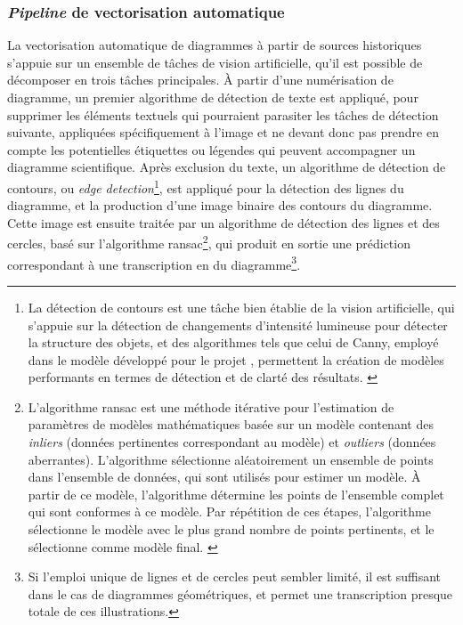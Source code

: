	\subsubsection{\textit{Pipeline} de vectorisation automatique}
	La vectorisation automatique de diagrammes à partir de sources historiques s'appuie sur un ensemble de tâches de vision artificielle, qu'il est possible de décomposer en trois tâches principales. À partir d'une numérisation de diagramme, un premier algorithme de détection de texte est appliqué, pour supprimer les éléments textuels qui pourraient parasiter les tâches de détection suivante, appliquées spécifiquement à l'image et ne devant donc pas prendre en compte les potentielles étiquettes ou légendes qui peuvent accompagner un diagramme scientifique. Après exclusion du texte, un algorithme de détection de contours, ou \textit{edge detection}\footnote{La détection de contours est une tâche bien établie de la vision artificielle, qui s'appuie sur la détection de changements d'intensité lumineuse pour détecter la structure des objets, et des algorithmes tels que celui de Canny, employé dans le modèle développé pour le projet \eida, permettent la création de modèles performants en termes de détection et de clarté des résultats. \cite{cannyComputationalApproachEdge1986}}, est appliqué pour la détection des lignes du diagramme, et la production d'une image binaire des contours du diagramme. Cette image est ensuite traitée par un algorithme de détection des lignes et des cercles, basé sur l'algorithme \acrfull{ransac}\footnote{L'algorithme \acrshort{ransac} est une méthode itérative pour l'estimation de paramètres de modèles mathématiques basée sur un modèle contenant des \textit{inliers} (données pertinentes correspondant au modèle) et \textit{outliers} (données aberrantes). L'algorithme sélectionne aléatoirement un ensemble de points dans l'ensemble de données, qui sont utilisés pour estimer un modèle. À partir de ce modèle, l'algorithme détermine les points de l'ensemble complet qui sont conformes à ce modèle. Par répétition de ces étapes, l'algorithme sélectionne le modèle avec le plus grand nombre de points pertinents, et le sélectionne comme modèle final. \cite{derpanisOverviewRANSACAlgorithm2010a}}, qui produit en sortie une prédiction correspondant à une transcription en \svg du diagramme\footnote{Si l'emploi unique de lignes et de cercles peut sembler limité, il est suffisant dans le cas de diagrammes géométriques, et permet une transcription presque totale de ces illustrations.}. 
	
